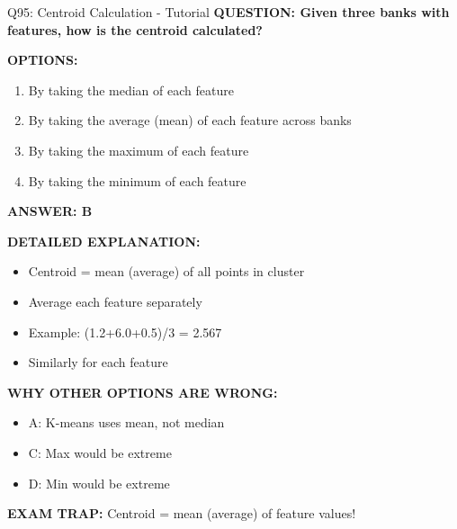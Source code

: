 \documentclass[8pt]{beamer}
\begin{document}
	\begin{frame}{Q95: Centroid Calculation - Tutorial}
		\fontsize{6.5}{7.5}\selectfont
		\textbf{QUESTION: Given three banks with features, how is the centroid calculated?}
		
		\vspace{0.1cm}
		\textbf{OPTIONS:}
		\begin{enumerate}
			\item By taking the median of each feature
			\item By taking the average (mean) of each feature across banks
			\item By taking the maximum of each feature
			\item By taking the minimum of each feature
		\end{enumerate}
		
		\vspace{0.1cm}
		\textcolor{myblue}{\textbf{ANSWER: B}}
		
		\vspace{0.1cm}
		\textbf{DETAILED EXPLANATION:}
		\begin{itemize}
			\item Centroid = mean (average) of all points in cluster
			\item Average each feature separately
			\item Example: (1.2+6.0+0.5)/3 = 2.567
			\item Similarly for each feature
		\end{itemize}
		
		\vspace{0.1cm}
		\textcolor{myred}{\textbf{WHY OTHER OPTIONS ARE WRONG:}}
		\begin{itemize}
			\item \textcolor{myred}{A:} K-means uses mean, not median
			\item \textcolor{myred}{C:} Max would be extreme
			\item \textcolor{myred}{D:} Min would be extreme
		\end{itemize}
		
		\textcolor{myred}{\textbf{EXAM TRAP:}} Centroid = \textcolor{myblue}{mean (average) of feature values}!
	\end{frame}
	
\end{document}

